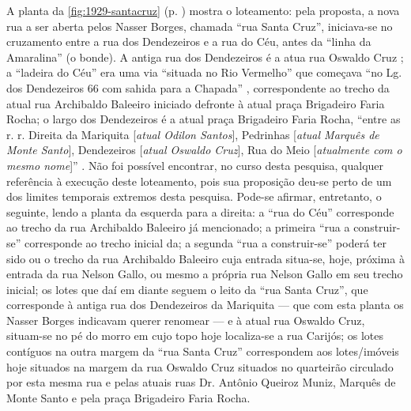 A planta da \autoref{fig:1929-santacruz} (p. \pageref{fig:1929-santacruz}) mostra o loteamento: pela proposta, a nova rua a ser aberta pelos Nasser Borges, chamada ``rua Santa Cruz'', iniciava-se no cruzamento entre a rua dos Dendezeiros e a rua do Céu, antes da ``linha da Amaralina'' (o bonde). A antiga rua dos Dendezeiros é a atua rua Oswaldo Cruz \cite[p.~100]{souza_guia_1935}; a ``ladeira do Céu'' era uma via ``situada no Rio Vermelho'' que começava ``no Lg. dos Dendezeiros 66 com sahida para a Chapada'' \cite[p.~33]{souza_guia_1935}, correspondente ao trecho da atual rua Archibaldo Baleeiro iniciado defronte à atual praça Brigadeiro Faria Rocha; o largo dos Dendezeiros é a atual praça Brigadeiro Faria Rocha, ``entre as r. r. Direita da Mariquita [\textit{atual Odilon Santos}], Pedrinhas [\textit{atual Marquês de Monte Santo}], Dendezeiros [\textit{atual Oswaldo Cruz}], Rua do Meio [\textit{atualmente com o mesmo nome}]'' \cite[p.~22]{souza_guia_1935}. Não foi possível encontrar, no curso desta pesquisa, qualquer referência à execução deste loteamento, pois sua proposição deu-se perto de um dos limites temporais extremos desta pesquisa. Pode-se afirmar, entretanto, o seguinte, lendo a planta da esquerda para a direita: a ``rua do Céu'' corresponde ao trecho da rua Archibaldo Baleeiro já mencionado; a primeira ``rua a construir-se'' corresponde ao trecho inicial da; a segunda ``rua a construir-se'' poderá ter sido ou o trecho da rua Archibaldo Baleeiro cuja entrada situa-se, hoje, próxima à entrada da rua Nelson Gallo, ou mesmo a própria rua Nelson Gallo em seu trecho inicial; os lotes que daí em diante seguem o leito da ``rua Santa Cruz'', que corresponde à antiga rua dos Dendezeiros da Mariquita --- que com esta planta os Nasser Borges indicavam querer renomear --- e à atual rua Oswaldo Cruz, situam-se no pé do morro em cujo topo hoje localiza-se a rua Carijós; os lotes contíguos na outra margem da ``rua Santa Cruz'' correspondem aos lotes/imóveis hoje situados na margem da rua Oswaldo Cruz situados no quarteirão circulado por esta mesma rua e pelas atuais ruas Dr. Antônio Queiroz Muniz, Marquês de Monte Santo e pela praça Brigadeiro Faria Rocha.

